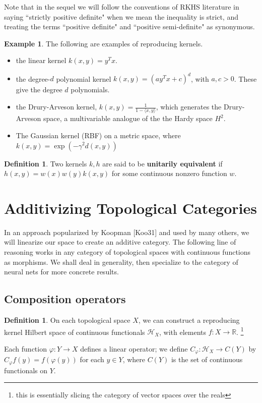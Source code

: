 \documentclass[12pt]{amsart}
\theoremstyle{definition}
\newtheorem{definition}[theorem]{Definition}
\newtheorem{example}{Example}[theorem]
\numberwithin{equation}{section}
\begin{document}
Note that in the sequel we will follow the conventions of RKHS literature in saying ``strictly positive definite" when we mean the inequality is strict, and treating the terms ``positive definite" and ``positive semi-definite" as synonymous. 

\begin{example} The following are examples of reproducing kernels. 
\begin{itemize}
    \item the linear kernel $k(x,y) = y^Tx$. 
    \item the degree-$d$ polynomial kernel $k(x, y) = (a y^Tx+c)^d$, with $a, c > 0$. These give the degree $d$ polynomials. 
    \item the Drury-Arveson kernel, $k(x, y) = \frac{1}{1-\langle x, y\rangle}$, which generates the Drury-Arveson space, a multivariable analogue of the the Hardy space $H^2$. 
    \item The Gaussian kernel (RBF) on a metric space, where $k(x, y) = \exp(-\gamma^2 d(x, y))$
\end{itemize}
\end{example}


\begin{definition}Two kernels $k, h$ are said to be \textbf{unitarily equivalent} if $h(x,y) = w(x)w(y)k(x,y)$ for some continuous nonzero function $w$. \end{definition}

\section{Additivizing Topological Categories}

In an approach popularized by Koopman [Koo31] and used by many others, we will linearize our space to create an additive category. The following line of reasoning works in any category of topological spaces with continuous functions as morphisms. We shall deal in generality, then specialize to the category of neural nets for more concrete results.

\subsection{Composition operators}
\begin{definition}
    On each topological space $X$, we can construct a reproducing kernel Hilbert space of continuous functionals $\mathcal H_X$, with elements $f: X \rightarrow \mathbb R$. \footnote{this is essentially slicing the category of vector spaces over the reals} 


    Each function $\varphi: Y \rightarrow X$ defines a linear operator; we define $C_\varphi: \mathcal H_X \rightarrow C(Y)$ by $C_\varphi f(y)= f(\varphi (y))$ for each $y \in Y$, where $C(Y)$ is the set of continuous functionals on $Y$. 
\end{definition}
\end{document}
